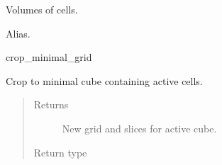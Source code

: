 \documentclass[letterpaper,10pt,english]{sphinxmanual}
\begin{document}
\begin{fulllineitems}
\begin{fulllineitems}
\label{\detokenize{api/grids:geology.src.CornerPointGrid.cell_volumes}}
Volumes of cells.

\end{fulllineitems}


\begin{fulllineitems}
\label{\detokenize{api/grids:geology.src.CornerPointGrid.crop_minimal_active_grid}}
Alias.

crop\_minimal\_grid

\end{fulllineitems}


\begin{fulllineitems}
\label{\detokenize{api/grids:geology.src.CornerPointGrid.crop_minimal_cube}}
Crop to minimal cube containing active cells.
\begin{quote}\begin{description}
\item[{Returns}] \leavevmode
{} \textendash{} New grid and slices for active cube.

\item[{Return type}] \leavevmode
{}

\end{description}\end{quote}

\end{fulllineitems}



\end{fulllineitems}
\end{document}

